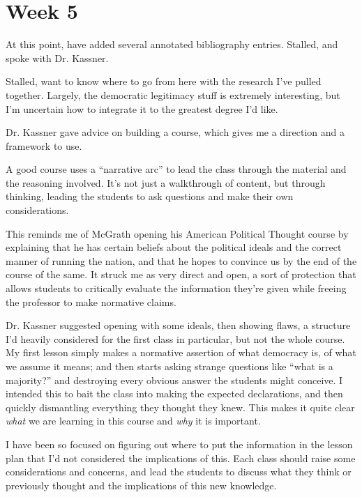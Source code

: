 
\section{Week 5}

At this point, have added several annotated bibliography entries.  Stalled, and spoke with Dr. Kassner.

Stalled, want to know where to go from here with the research I've pulled together.  Largely, the democratic legitimacy stuff is extremely interesting, but I'm uncertain how to integrate it to the greatest degree I'd like.

Dr. Kassner gave advice on building a course, which gives me a direction and a framework to use.

A good course uses a ``narrative arc'' to lead the class through the material and the reasoning involved.  It's not just a walkthrough of content, but through thinking, leading the students to ask questions and make their own considerations.

This reminds me of McGrath opening his American Political Thought course by explaining that he has certain beliefs about the political ideals and the correct manner of running the nation, and that he hopes to convince us by the end of the course of the same.  It struck me as very direct and open, a sort of protection that allows students to critically evaluate the information they're given while freeing the professor to make normative claims.

Dr. Kassner suggested opening with some ideals, then showing flaws, a structure I'd heavily considered for the first class in particular, but not the whole course.  My first lesson simply makes a normative assertion of what democracy is, of what we assume it means; and then starts asking strange questions like ``what is a majority?'' and destroying every obvious answer the students might conceive.  I intended this to bait the class into making the expected declarations, and then quickly dismantling everything they thought they knew.  This makes it quite clear \textit{what} we are learning in this course and \textit{why} it is important.

I have been so focused on figuring out where to put the information in the lesson plan that I'd not considered the implications of this.  Each class should raise some considerations and concerns, and lead the students to discuss what they think or previously thought and the implications of this new knowledge.

